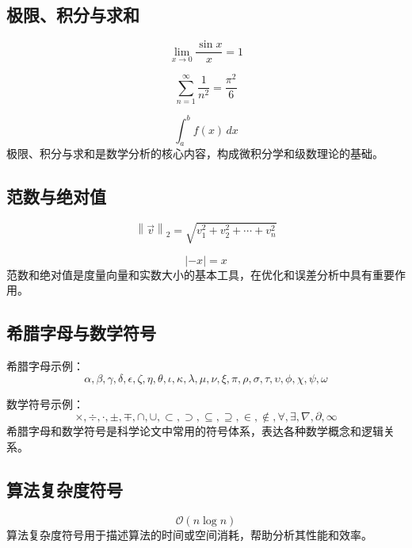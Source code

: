 \subsection{极限、积分与求和}
\begin{equation}
\lim_{x \to 0} \frac{\sin x}{x} = 1
\end{equation}

\begin{equation}
\sum_{n=1}^{\infty} \frac{1}{n^2} = \frac{\pi^2}{6}
\end{equation}

\begin{equation}
\int_{a}^{b} f(x) \, dx
\end{equation}
极限、积分与求和是数学分析的核心内容，构成微积分学和级数理论的基础。

\subsection{范数与绝对值}
\begin{equation}
\left\| \vec{v} \right\|_{2} = \sqrt{v_1^2 + v_2^2 + \cdots + v_n^2}
\end{equation}

\begin{equation}
\left | -x \right |  = x
\end{equation}
范数和绝对值是度量向量和实数大小的基本工具，在优化和误差分析中具有重要作用。

\subsection{希腊字母与数学符号}
希腊字母示例：
\begin{equation}
\alpha, \beta, \gamma, \delta, \epsilon, \zeta, \eta, \theta, \iota, \kappa, \lambda, \mu, \nu, \xi, \pi, \rho, \sigma, \tau, \upsilon, \phi, \chi, \psi, \omega
\end{equation}

数学符号示例：
\begin{equation}
\times, \div, \cdot, \pm, \mp, \cap, \cup, \subset, \supset, \subseteq, \supseteq, \in, \notin, \forall, \exists, \nabla, \partial, \infty
\end{equation}
希腊字母和数学符号是科学论文中常用的符号体系，表达各种数学概念和逻辑关系。

\subsection{算法复杂度符号}
\begin{equation}
\mathcal{O}(n \log n)
\end{equation}
算法复杂度符号用于描述算法的时间或空间消耗，帮助分析其性能和效率。


